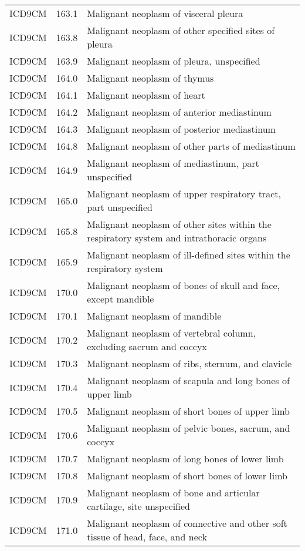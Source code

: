 \begin{longtable}{p{}p{}p{}}
  ICD9CM & 163.1 & Malignant neoplasm of visceral pleura \\ 
  ICD9CM & 163.8 & Malignant neoplasm of other specified sites of pleura \\ 
  ICD9CM & 163.9 & Malignant neoplasm of pleura, unspecified \\ 
  ICD9CM & 164.0 & Malignant neoplasm of thymus \\ 
  ICD9CM & 164.1 & Malignant neoplasm of heart \\ 
  ICD9CM & 164.2 & Malignant neoplasm of anterior mediastinum \\ 
  ICD9CM & 164.3 & Malignant neoplasm of posterior mediastinum \\ 
  ICD9CM & 164.8 & Malignant neoplasm of other parts of mediastinum \\ 
  ICD9CM & 164.9 & Malignant neoplasm of mediastinum, part unspecified \\ 
  ICD9CM & 165.0 & Malignant neoplasm of upper respiratory tract, part unspecified \\ 
  ICD9CM & 165.8 & Malignant neoplasm of other sites within the respiratory system and intrathoracic organs \\ 
  ICD9CM & 165.9 & Malignant neoplasm of ill-defined sites within the respiratory system \\ 
  ICD9CM & 170.0 & Malignant neoplasm of bones of skull and face, except mandible \\ 
  ICD9CM & 170.1 & Malignant neoplasm of mandible \\ 
  ICD9CM & 170.2 & Malignant neoplasm of vertebral column, excluding sacrum and coccyx \\ 
  ICD9CM & 170.3 & Malignant neoplasm of ribs, sternum, and clavicle \\ 
  ICD9CM & 170.4 & Malignant neoplasm of scapula and long bones of upper limb \\ 
  ICD9CM & 170.5 & Malignant neoplasm of short bones of upper limb \\ 
  ICD9CM & 170.6 & Malignant neoplasm of pelvic bones, sacrum, and coccyx \\ 
  ICD9CM & 170.7 & Malignant neoplasm of long bones of lower limb \\ 
  ICD9CM & 170.8 & Malignant neoplasm of short bones of lower limb \\ 
  ICD9CM & 170.9 & Malignant neoplasm of bone and articular cartilage, site unspecified \\ 
  ICD9CM & 171.0 & Malignant neoplasm of connective and other soft tissue of head, face, and neck \\ 

\end{longtable}
